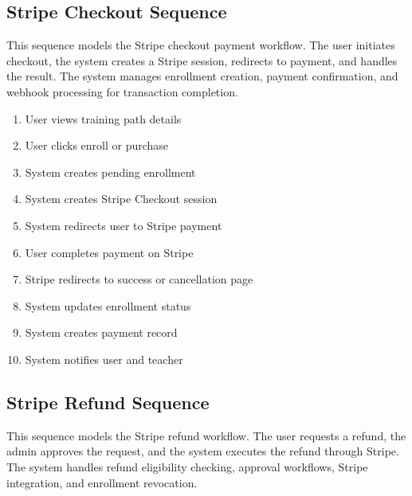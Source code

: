 
\subsection{Stripe Checkout Sequence}
This sequence models the Stripe checkout payment workflow. The user initiates
checkout, the system creates a Stripe session, redirects to payment, and
handles the result. The system manages enrollment creation, payment
confirmation, and webhook processing for transaction completion.

\begin{enumerate}[topsep=0pt,itemsep=1pt,parsep=0pt,partopsep=0pt]
    \item User views training path details
    \item User clicks enroll or purchase
    \item System creates pending enrollment
    \item System creates Stripe Checkout session
    \item System redirects user to Stripe payment
    \item User completes payment on Stripe
    \item Stripe redirects to success or cancellation page
    \item System updates enrollment status
    \item System creates payment record
    \item System notifies user and teacher
\end{enumerate}


\subsection{Stripe Refund Sequence}
This sequence models the Stripe refund workflow. The user requests a refund,
the admin approves the request, and the system executes the refund through
Stripe. The system handles refund eligibility checking, approval workflows,
Stripe integration, and enrollment revocation.

